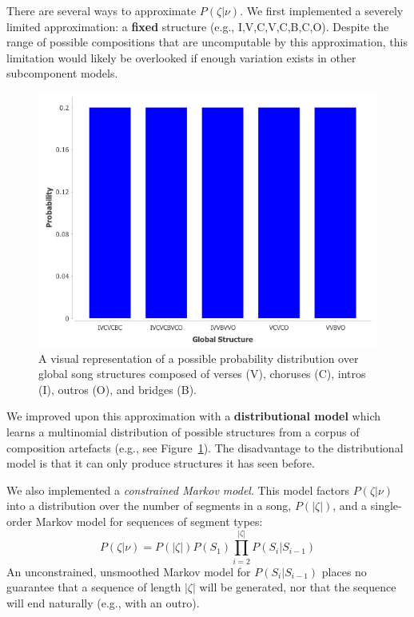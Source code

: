 \documentclass[letterpaper]{article}
\begin{document}
There are several ways to approximate $P(\zeta|\nu)$. We first implemented a severely limited approximation: a \textbf{fixed} structure (e.g., I,V,C,V,C,B,C,O). Despite the range of possible compositions that are uncomputable by this approximation, this limitation would likely be overlooked if enough variation exists in other subcomponent models.

\begin{figure}
	\centering
	\includegraphics[width=\linewidth]{global_structure}
	\caption{\label{fig:global_structure} A visual representation of a possible probability distribution over global song structures composed of verses (V), choruses (C), intros (I), outros (O), and bridges (B).}
\end{figure}

We improved upon this approximation with a \textbf{distributional model} which learns a multinomial distribution of possible structures from a corpus of composition artefacts (e.g., see Figure~\ref{fig:global_structure}). The disadvantage to the distributional model is that it can only produce structures it has seen before. 

We also implemented a \emph{constrained Markov model}. This model factors $P(\zeta|\nu)$ into a distribution over the number of segments in a song, $P(|\zeta|)$, and a single-order Markov model for sequences of segment types:
\[ P(\zeta|\nu) = P(|\zeta|) P(S_1) \prod_{i=2}^{|\zeta|} P(S_i|S_{i-1}) \]
\noindent An unconstrained, unsmoothed Markov model for $P(S_i|S_{i-1})$ places no guarantee that a sequence of length $|\zeta|$ will be generated, nor that the sequence will end naturally (e.g., with an outro). 
\end{document}
